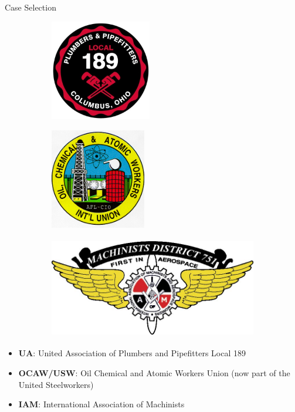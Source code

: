 \documentclass{beamer}
\begin{document}
\begin{frame}{Case Selection}
\begin{figure}
\begin{subfigure}[t]{0.3\linewidth}
  \centering
  \includegraphics[height=125pt]{UA_189}
\end{subfigure}%
\begin{subfigure}[t]{0.3\linewidth}
  \centering
  \includegraphics[height=125pt]{OCAW}
\end{subfigure}%
\begin{subfigure}[t]{0.3\linewidth}
  \centering
  \includegraphics[height=125pt]{IAM_751}
\end{subfigure}
\end{figure}

\vfill

	\begin{itemize}
			\item \textbf{UA}: United Association of Plumbers and Pipefitters Local 189
			\item \textbf{OCAW/USW}: Oil Chemical and Atomic Workers Union (now part of the United Steelworkers)
			\item \textbf{IAM}: International Association of Machinists
	\end{itemize}
\end{frame}
\end{document}
